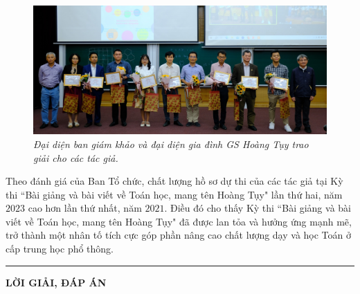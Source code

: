 	\begin{figure}[H]
		\vspace*{5pt}
		\centering
		\captionsetup{labelformat= empty, justification=centering}
		\includegraphics[width= 1\linewidth]{10}
		\caption{\small\textit{\color{doisongtoanhoc}Đại diện ban giám khảo và đại diện gia đình GS Hoàng Tụy trao giải cho các tác giả.}}
		\vspace*{-10pt}
	\end{figure}
	\begin{multicols}{2}
	Theo đánh giá của Ban Tổ chức, chất lượng hồ sơ dự thi của các tác giả tại Kỳ thi ``Bài giảng và bài viết về Toán học, mang tên Hoàng Tụy" lần thứ hai, năm $2023$ cao hơn lần thứ nhất, năm $2021$. Điều đó cho thấy Kỳ thi ``Bài giảng và bài viết về Toán học, mang tên Hoàng Tụy" đã được lan tỏa và hưởng ứng mạnh mẽ, trở thành một nhân tố tích cực góp phần nâng cao chất lượng dạy và học Toán ở cấp trung học phổ thông. 
\end{multicols}
\vspace*{-10pt}
{\color{doisongtoanhoc}\rule{1\linewidth}{0.1pt}}
\vskip 0.2cm
{\centerline{\LARGE\textbf{\color{doisongtoanhoc}LỜI GIẢI, ĐÁP ÁN}}}
